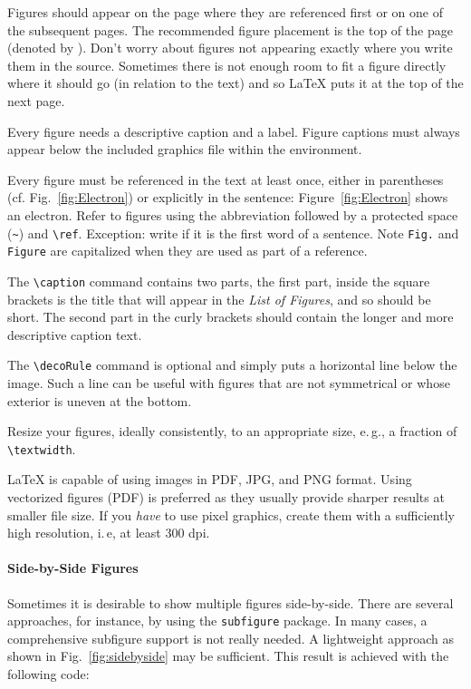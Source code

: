 Figures should appear on the page where they are referenced first or on one of the subsequent pages. The recommended figure placement is the top of the page (denoted by \code{[t]}). Don't worry about figures not appearing exactly where you write them in the source. Sometimes there is not enough room to fit a figure directly where it should go (in relation to the text) and so LaTeX puts it at the top of the next page.

Every figure needs a descriptive caption and a label. Figure captions must always appear below the included graphics file within the  environment.

Every figure must be referenced in the text at least once, either in parentheses (cf. Fig.~\ref{fig:Electron}) or explicitly in the sentence: Figure~\ref{fig:Electron} shows an electron. Refer to figures using the abbreviation  followed by a protected space (\verb|~|) and \verb|\ref|. Exception: write  if it is the first word of a sentence. Note \verb|Fig.| and \verb|Figure| are capitalized when they are used as part of a reference.

The \verb|\caption| command contains two parts,%
the first part, inside the square brackets is the title that will appear in the \emph{List of Figures}, and so should be short.
 The second part in the curly brackets should contain the longer and more descriptive caption text.

The \verb|\decoRule| command is optional and simply puts a horizontal line below the image. Such a line can be useful with figures that are not symmetrical or whose exterior is uneven at the bottom.

Resize your figures, ideally consistently, to an appropriate size, e.\,g., a fraction of \texttt{\textbackslash textwidth}.

LaTeX is capable of using images in PDF, JPG, and PNG format. Using vectorized figures (PDF) is preferred as they usually provide sharper results at smaller file size. If you \emph{have} to use pixel graphics, create them with a sufficiently high resolution, i.\,e, at least 300 dpi.

\paragraph{Side-by-Side Figures} Sometimes it is desirable to show multiple figures side-by-side. There are several approaches, for instance, by using the \texttt{subfigure} package. In many cases, a comprehensive subfigure support is not really needed. A lightweight approach as shown in Fig.~\ref{fig:sidebyside} may be sufficient. This result is achieved with the following code:

